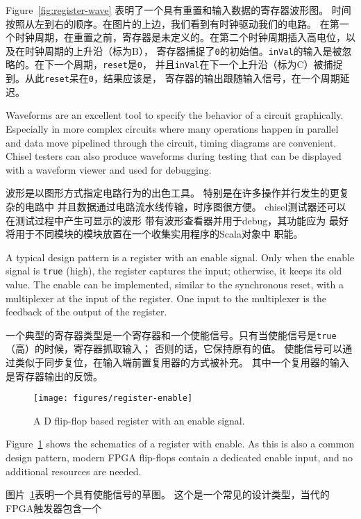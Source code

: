 \documentclass[%
    10pt,
    headinclude, footexclude,
    openright, %
    notitlepage,
    cleardoubleempty,
    headsepline,
    pointlessnumbers,
    bibtotoc, idxtotoc,
    ]{scrbook}
\newcommand{\code}[1]{{\small{\texttt{#1}}}}
\newcommand{\scale}{0.7}
\begin{document}
Figure~\ref{fig:register-wave} 表明了一个具有重置和输入数据的寄存器波形图。
时间按照从左到右的顺序。在图片的上边，我们看到有时钟驱动我们的电路。
在第一个时钟周期，在重置之前，寄存器是未定义的。在第二个时钟周期插入高电位，以及在时钟周期的上升沿（标为B），
寄存器捕捉了\code{0}的初始值。\code{inVal}的输入是被忽略的。在下一个周期，\code{reset}是\code{0}，
并且\code{inVal}在下一个上升沿（标为C）被捕捉到。从此\code{reset}呆在\code{0}，结果应该是，
寄存器的输出跟随输入信号，在一个周期延迟。

Waveforms are an excellent tool to specify the behavior of a circuit graphically.
Especially in more complex circuits where many operations happen in parallel
and data move pipelined through the circuit, timing diagrams are convenient.
Chisel testers can also produce waveforms during testing that can be displayed
with a waveform viewer and used for debugging.


波形是以图形方式指定电路行为的出色工具。
特别是在许多操作并行发生的更复杂的电路中
并且数据通过电路流水线传输，时序图很方便。
chisel测试器还可以在测试过程中产生可显示的波形
带有波形查看器并用于debug，其功能应为
最好将用于不同模块的模块放置在一个收集实用程序的Scala对象中
职能。

A typical design pattern is a register with an enable signal. Only when the enable signal
is \code{true} (high), the register captures the input; otherwise, it keeps its old value.
The enable can be implemented, similar to the synchronous reset, with
a multiplexer at the input of the register. One input to the multiplexer is the feedback of the
output of the register.

一个典型的寄存器类型是一个寄存器和一个使能信号。只有当使能信号是\code{true}（高）的时候，寄存器抓取输入；
否则的话，它保持原有的值。
使能信号可以通过类似于同步复位，在输入端前置复用器的方式被补充。
其中一个复用器的输入是寄存器输出的反馈。

\begin{figure}
  \centering
  \texttt{[image: figures/register-enable]}
  \caption{A D flip-flop based register with an enable signal.}
  \label{fig:register-enable}
\end{figure}

Figure~\ref{fig:register-enable} shows the schematics of a register with enable.
As this is also a common design pattern, modern FPGA flip-flops contain a
dedicated enable input, and no additional resources are needed.

图片~\ref{fig:register-enable}表明一个具有使能信号的草图。
这个是一个常见的设计类型，当代的FPGA触发器包含一个
\end{document}
